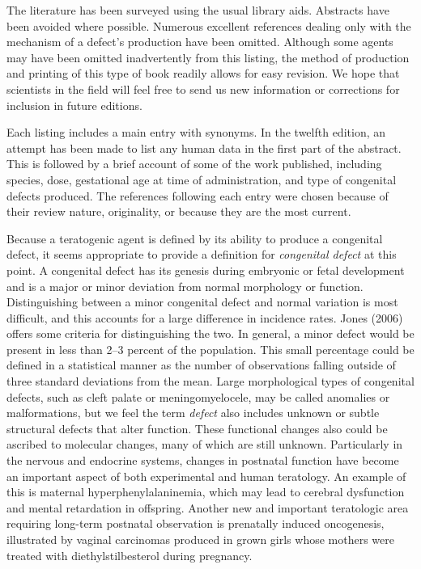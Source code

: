 The literature has been surveyed using the usual library aids. 
Abstracts have been avoided where possible. Numerous
excellent references dealing only with the mechanism of a defect's
production have been omitted. Although some agents may have been
omitted inadvertently from this listing, the method of production and
printing of this type of book readily allows for easy revision.  We
hope that scientists in the field will feel free to send us new
information or corrections for inclusion in future editions.

Each listing includes a main entry with synonyms.  In the twelfth
edition, an attempt has been made to list any human data in the first
part of the abstract. This is followed by a brief account of some of
the work published, including species, dose, gestational age at time
of administration, and type of congenital defects produced. The
references following each entry were chosen because of their review
nature, originality, or because they are the most current.

Because a teratogenic agent is defined by its ability to produce a
congenital defect, it seems appropriate to provide a definition for
{\it congenital defect} at this point. A congenital defect has its
genesis during embryonic or fetal development and is a major
or minor deviation from normal morphology or function. Distinguishing
between a minor congenital defect and normal variation is most
difficult, and this accounts for a large difference in
incidence rates.  Jones (2006) offers some criteria for
distinguishing the two.  In general, a minor defect would be present
in less than 2--3 percent of the population. This small
percentage could be defined in a statistical manner as the number of
observations falling outside of three standard deviations from the
mean. Large morphological types of congenital defects, such as cleft
palate or meningomyelocele, may be called anomalies or malformations,
but we feel the term \textit{defect} also includes unknown or subtle
structural defects that alter function. These functional changes also
could be ascribed to molecular changes, many of which are still
unknown. Particularly in the nervous and endocrine systems, changes
in postnatal function have become an important aspect of both
experimental and human teratology. An example of this is maternal
hyperphenylalani\-nemia, which may lead to cerebral dysfunction and
mental retardation in offspring. Another new and important
teratologic area requiring long-term postnatal observation is
prenatally induced oncogenesis, illustrated by vaginal carcinomas
produced in grown girls whose mothers were treated with
diethylstilbesterol during pregnancy.

